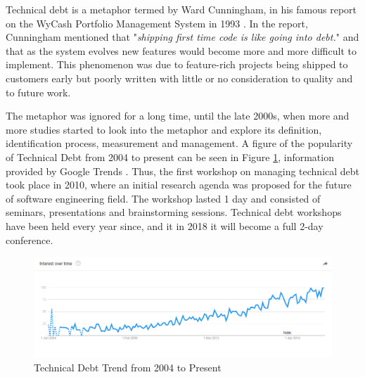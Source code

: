 \documentclass{mprop}
\begin{document}
Technical debt is a metaphor termed by Ward Cunningham, in his famous report on the WyCash Portfolio Management System in 1993 \cite{Cunningham1993}.
In the report, Cunningham mentioned that "\textit{shipping first time code is like going into debt.}" and that as the system evolves new features would become more and more difficult to implement.
This phenomenon was due to feature-rich projects being shipped to customers early but poorly written with little or no consideration to quality and to future work. 

The metaphor was ignored for a long time, until the late 2000s, when more and more studies started to look into the metaphor and explore its definition, identification process, measurement and management.
A figure of the popularity of Technical Debt from 2004 to present can be seen in Figure \ref{fig:td-trend}, information provided by Google Trends \cite{GoogleTrends}.
Thus, the first workshop on managing technical debt took place in 2010, where an initial research agenda was proposed for the future of software engineering field.
The workshop lasted 1 day and consisted of seminars, presentations and brainstorming sessions.
Technical debt workshops have been held every year since, and it in 2018 it will become a full 2-day conference.

\begin{figure}
	\centering
	\includegraphics[width=\linewidth]{visualisations/TD_trend.png}
	\caption{Technical Debt Trend from 2004 to Present}
	\label{fig:td-trend}
\end{figure}
\end{document}
